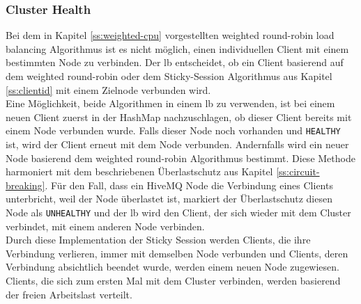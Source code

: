\newpage
\subsubsection{Cluster Health}
Bei dem in Kapitel \ref{ss:weighted-cpu} vorgestellten weighted round-robin load balancing Algorithmus ist es nicht möglich, einen individuellen Client mit einem bestimmten Node zu verbinden.
Der \acl{lb} entscheidet, ob ein Client basierend auf dem weighted round-robin oder dem Sticky-Session Algorithmus aus Kapitel \ref{ss:clientid} mit einem Zielnode verbunden wird.
\\
Eine Möglichkeit, beide Algorithmen in einem \acl{lb} zu verwenden, ist bei einem neuen Client zuerst in der HashMap nachzuschlagen, ob dieser Client bereits mit einem Node verbunden wurde. Falls dieser Node noch vorhanden und \verb|HEALTHY| ist, wird der Client erneut mit dem Node verbunden. Andernfalls wird ein neuer Node basierend dem weighted round-robin Algorithmus bestimmt.
Diese Methode harmoniert mit dem beschriebenen Überlastschutz aus Kapitel \ref{ss:circuit-breaking}. Für den Fall, dass ein HiveMQ Node die Verbindung eines Clients unterbricht, weil der Node überlastet ist, markiert der Überlastschutz diesen Node als \verb|UNHEALTHY| und der \acl{lb} wird den Client, der sich wieder mit dem Cluster verbindet, mit einem anderen Node verbinden.
\\
Durch diese Implementation der Sticky Session werden Clients, die ihre Verbindung verlieren, immer mit demselben Node verbunden und Clients, deren Verbindung absichtlich beendet wurde, werden einem neuen Node zugewiesen. Clients, die sich zum ersten Mal mit dem Cluster verbinden, werden basierend der freien Arbeitslast verteilt.
\newpage
